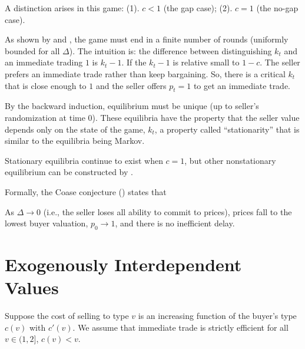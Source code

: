 \documentclass[11pt]{elegantbook}
\begin{document}
A distinction arises in this game: (1). $c<1$ (the gap case); (2). $c=1$ (the no-gap case).

As shown by \cite{fudenberg1985infinite} and \cite{gul1986foundations}, the game must end in a finite number of rounds (uniformly bounded for all $\Delta$). The intuition is: the difference between distinguishing $k_t$ and an immediate trading $1$ is $k_t-1$. If the $k_t-1$ is relative small to $1-c$. The seller prefers an immediate trade rather than keep bargaining. So, there is a critical $k_t$ that is close enough to $1$ and the seller offers $p_t=1$ to get an immediate trade.

By the backward induction, equilibrium must be unique (up to seller's randomization at time $0$). These equilibria have the property that the seller value depends only on the state of the game, $k_t$, a property called ``stationarity'' that is similar to the equilibria being Markov.

Stationary equilibria continue to exist when $c = 1$, but other nonstationary equilibrium can be constructed by \cite{ausubel1989reputation}.

Formally, the Coase conjecture (\cite{coase1972durability}) states that
\begin{proposition}
    As $\Delta \rightarrow 0$ (i.e., the seller loses all ability to commit to prices), prices fall to the lowest buyer valuation, $p_0 \rightarrow 1$, and there is no inefficient delay.
\end{proposition}


\section{Exogenously Interdependent Values}
Suppose the cost of selling to type $v$ is an increasing function of the buyer's type $c(v)$ with $c'(v)$. We assume that immediate trade is strictly efficient for all $v\in (1,2]$, $c(v)<v$.
\end{document}
